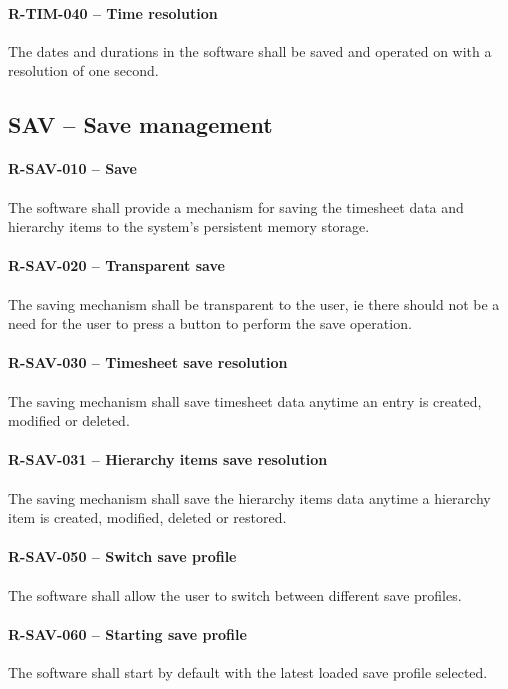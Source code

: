\paragraph{R-TIM-040 -- Time resolution}
The dates and durations in the software shall be saved and operated
on with a resolution of one second.

\subsection{SAV -- Save management}
\paragraph{R-SAV-010 -- Save}
The software shall provide a mechanism for saving the timesheet data
and hierarchy items to the system's persistent memory storage.

\paragraph{R-SAV-020 -- Transparent save}
The saving mechanism shall be transparent to the user, ie there should
not be a need for the user to press a button to perform the save operation.

\paragraph{R-SAV-030 -- Timesheet save resolution}
The saving mechanism shall save timesheet data anytime an entry is
created, modified or deleted.

\paragraph{R-SAV-031 -- Hierarchy items save resolution}
The saving mechanism shall save the hierarchy items data anytime
a hierarchy item is created, modified, deleted or restored.

\paragraph{R-SAV-050 -- Switch save profile}
The software shall allow the user to switch between different save profiles.

\paragraph{R-SAV-060 -- Starting save profile}
The software shall start by default with the latest loaded save profile
selected.

